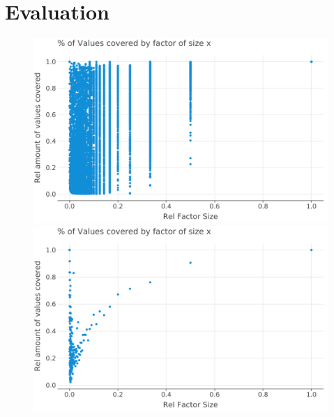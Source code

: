 
\chapter{Evaluation}
\label{ch:Evaluation}
\begin{figure}[h]
	\includegraphics[width=\linewidth]{../plots/SHORTEST_PERIODS-all-relative-values-by-factor-size.png}
	\includegraphics[width=\linewidth]{../plots/SHORTEST_PERIODS-all-relative-values-by-factor-size-average.png}
\end{figure}


